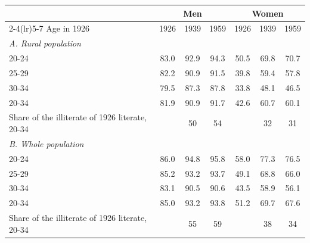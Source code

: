 \begin{tabular}{lcccccc}
\toprule
 & \multicolumn{3}{c}{Men} & \multicolumn{3}{c}{Women} \\
\cmidrule(lr){2-4}\cmidrule(lr){5-7}
Age in 1926 & 1926 & 1939 & 1959 & 1926 & 1939 & 1959 \\
\midrule
\multicolumn{7}{l}{\textit{A. Rural population}} \\
20-24 & 83.0 & 92.9 & 94.3 & 50.5 & 69.8 & 70.7 \\
25-29 & 82.2 & 90.9 & 91.5 & 39.8 & 59.4 & 57.8 \\
30-34 & 79.5 & 87.3 & 87.8 & 33.8 & 48.1 & 46.5 \\
20-34 & 81.9 & 90.9 & 91.7 & 42.6 & 60.7 & 60.1 \\
Share of the illiterate of 1926 literate, 20-34 & & 50 & 54 & & 32 & 31 \\
\midrule
\multicolumn{7}{l}{\textit{B. Whole population}} \\
20-24 & 86.0 & 94.8 & 95.8 & 58.0 & 77.3 & 76.5 \\
25-29 & 85.2 & 93.2 & 93.7 & 49.1 & 68.8 & 66.0 \\
30-34 & 83.1 & 90.5 & 90.6 & 43.5 & 58.9 & 56.1 \\
20-34 & 85.0 & 93.2 & 93.8 & 51.2 & 69.7 & 67.6 \\
Share of the illiterate of 1926 literate, 20-34 & & 55 & 59 & & 38 & 34 \\
\bottomrule
\end{tabular}
